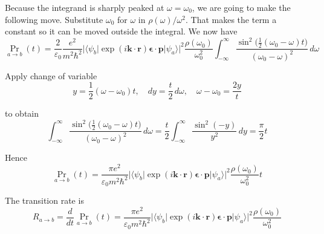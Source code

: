 Because the integrand is sharply peaked at $\omega=\omega_0$,
we are going to make the following move.
Substitute $\omega_0$ for $\omega$ in $\rho(\omega)/\omega^2$.
That makes the term a constant so it can be moved outside the integral.
We now have
\begin{equation*}
\Pr_{a\rightarrow b}(t)
=\frac{2}{\varepsilon_0}
\frac{e^2}{m^2\hbar^2}
\bigl|\langle\psi_b|\exp(i\mathbf k\cdot\mathbf r)\boldsymbol{\epsilon}\cdot\mathbf p|\psi_a\rangle\bigr|^2
\frac{\rho(\omega_0)}{\omega_0^2}
\int_{-\infty}^\infty
\frac{\sin^2\bigl(\tfrac{1}{2}(\omega_0-\omega)t\bigr)}{(\omega_0-\omega)^2}\,d\omega
\end{equation*}

Apply change of variable
\begin{equation*}
y=\frac{1}{2}(\omega-\omega_0)t,\quad
dy=\frac{t}{2}\,d\omega,\quad
\omega-\omega_0=\frac{2y}{t}
\end{equation*}

to obtain
\begin{equation*}
\int_{-\infty}^\infty
\frac{\sin^2\bigl(\tfrac{1}{2}(\omega_0-\omega)t\bigr)}{(\omega_0-\omega)^2}\,d\omega
=\frac{t}{2}\int_{-\infty}^\infty\frac{\sin^2(-y)}{y^2}\,dy
=\frac{\pi}{2}t
\end{equation*}

Hence
\begin{equation*}
\Pr_{a\rightarrow b}(t)
=\frac{\pi e^2}{\varepsilon_0m^2\hbar^2}
\bigl|\langle\psi_b|\exp(i\mathbf k\cdot\mathbf r)\boldsymbol{\epsilon}\cdot\mathbf p|\psi_a\rangle\bigr|^2
\frac{\rho(\omega_0)}{\omega_0^2}
t
\end{equation*}

The transition rate is
\begin{equation*}
R_{a\rightarrow b}=\frac{d}{dt}\Pr_{a\rightarrow b}(t)
=\frac{\pi e^2}{\varepsilon_0m^2\hbar^2}
\bigl|\langle\psi_b|\exp(i\mathbf k\cdot\mathbf r)\boldsymbol{\epsilon}\cdot\mathbf p|\psi_a\rangle\bigr|^2
\frac{\rho(\omega_0)}{\omega_0^2}
\end{equation*}

